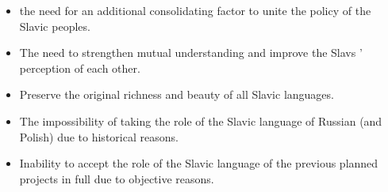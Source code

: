 \begin{itemize}
	\item the need for an additional consolidating factor to unite the policy of the Slavic peoples.
	\item The need to strengthen mutual understanding and improve the Slavs ' perception of each other.
	\item Preserve the original richness and beauty of all Slavic languages.
	\item The impossibility of taking the role of the Slavic language of Russian (and Polish) due to historical reasons.
	\item Inability to accept the role of the Slavic language of the previous planned projects in full due to objective reasons.
\end{itemize}





